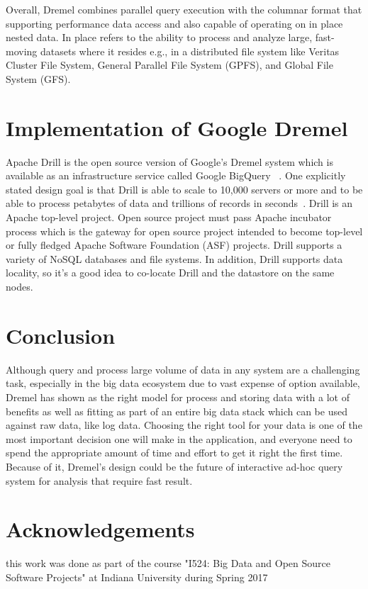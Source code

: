 \documentclass[9pt,twocolumn,twoside]{../../styles/osajnl}
\begin{document}
Overall, Dremel combines parallel query execution with the columnar format that supporting  performance data access and also capable of operating on in place nested data. In place refers to the ability to process and analyze large, fast-moving datasets where it resides e.g., in a distributed file system like Veritas Cluster File System,  General Parallel File System (GPFS), and  Global File System (GFS). 

\section{Implementation of Google Dremel }
Apache Drill is the open source version of Google's Dremel system which is available as an infrastructure service called Google BigQuery ~\cite{wiki-radar}. One explicitly stated design goal is that Drill is able to scale to 10,000 servers or more and to be able to process petabytes of data and trillions of records in seconds~\cite{wiki-drill}. Drill is an Apache top-level project. Open source project must pass Apache incubator process which is the gateway for open source project intended to become top-level or fully fledged Apache Software Foundation (ASF) projects.  Drill supports a variety of NoSQL databases and file systems. In addition, Drill supports data locality, so it's a good idea to co-locate Drill and the datastore on the same nodes.

\section{Conclusion}
 Although query and process large volume of data in any system are a challenging task, especially in the big data ecosystem due to vast expense of option available, Dremel has shown as the right model for process and storing data with a lot of benefits as well as fitting as part of an entire big data stack which can be used against raw data, like log data.  Choosing the right tool for your data is one of the most important decision one will make in the application, and everyone need to spend the appropriate amount of time and effort to get it right the first time. Because of it,  Dremel's design could be the future of interactive ad-hoc query system for analysis that require fast result. 
 
 \section{Acknowledgements}
this work was done as part of the course "I524: Big Data and Open Source Software Projects" at Indiana University during Spring 2017




 
\end{document}
